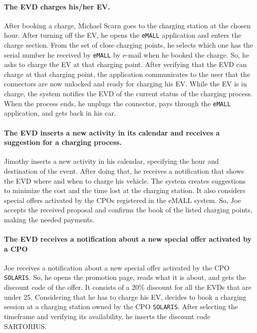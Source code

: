 \paragraph{The EVD charges his/her EV.}
After booking a charge, Michael Scarn goes to the charging station at the chosen hour.
After turning off the EV, he opens the \verb|eMALL| application and enters the charge section.
From the set of close charging points, he selects which one has the serial number he received by \verb|eMALL| by e-mail
when he booked the charge.
So, he asks to charge the EV at that charging point.
After verifying that the EVD can charge at that charging point, the application communicates to the user that the
connectors are now unlocked and ready for charging his EV\@.
While the EV is in charge, the system notifies the EVD of the current status of the charging process.
When the process ends, he unplugs the connector, pays through the \verb|eMALL| application, and gets back in his car.

\paragraph{The EVD inserts a new activity in its calendar and receives a suggestion for a charging process.}
Jimothy inserts a new activity in his calendar, specifying the hour and destination of the event.
After doing that, he receives a notification that shows the EVD where and when to charge his vehicle.
The system creates suggestions to minimize the cost and the time lost at the charging station.
It also considers special offers activated by the CPOs registered in the eMALL system.
So, Joe accepts the received proposal and confirms the book of the listed charging points, making the needed payments.

\paragraph{The EVD receives a notification about a new special offer activated by a CPO}
Joe receives a notification about a new special offer activated by the CPO \verb|SOLARIS|.
So, he opens the promotion page, reads what it is about, and gets the discount code of the offer.
It consists of a 20\% discount for all the EVDs that are under 25.
Considering that he has to charge his EV, decides to book a charging session at a charging station owned by the CPO \verb|SOLARIS|.
After selecting the timeframe and verifying its availability, he inserts the discount code SARTORIUS\@.


